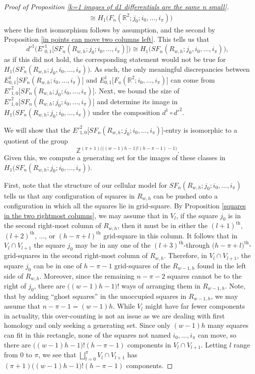 \documentclass[pagebackref,colorlinks,citecolor=blue,linkcolor=blue,urlcolor=blue,filecolor=blue]{article}
\theoremstyle{definition}\newtheorem{definition}[thm]{Definition}
\theoremstyle{definition}
\newcommand{\Z}{\ensuremath{\mathbb{Z}}}
\newcommand{\R}{\ensuremath{\mathbb{R}}}
\begin{document}
\begin{proof}[Proof of Proposition \ref{k=1 images of d1 differentials are the same n small}]
\begin{align*}
&\cong H_{1}\big(F_{n}(\R^{2}; j_{0}; i_{0}, \dots, i_{\pi})\big)
\end{align*}
where the first isomorphism follows by assumption, and the second by Proposition \ref{in points can move two columns left}.
This tells us that 
\[
d'^{1}\Big(E'^{1}_{0,1}\big[SF_{n}(R_{w, h}; j_{0}; i_{0}, \dots, i_{\pi})\big]\Big)\cong H_{1}\big(SF_{n}(R_{w, h}; j_{0}, i_{0}, \dots, i_{\pi})\big),
\]
as if this did not hold, the corresponding statement would not be true for $H_{1}\big(SF_{n}(R_{w, h}; j_{0}, i_{0}, \dots, i_{\pi})\big)$.
As such, the only meaningful discrepancies between $E^{1}_{0,1}\big[SF_{n}(R_{w, h}; i_{0}, \dots, i_{\pi})\big]$ and $E^{1}_{0,1}\big[F_{n}(\R^{2}; i_{0}, \dots, i_{\pi})\big]$ can come from $E'^{2}_{1, 0}\big[SF_{n}(R_{w, h}; j_{0}; i_{0}, \dots, i_{\pi})\big]$.
Next, we bound the size of $E'^{2}_{1, 0}\big[SF_{n}(R_{w, h}; j_{0}; i_{0}, \dots, i_{\pi})\big]$ and determine its image in $H_{1}\big(SF_{n}(R_{w, h}; j_{0}; i_{0}, \dots, i_{\pi})\big)$ under the composition $d^{1}\circ d'^{2}$.

We will show that the $E'^{2}_{1,0}\big[SF_{n}(R_{w, h}; j_{0}; i_{0}, \dots, i_{\pi})\big]$-entry is isomorphic to a quotient of the group
\[ \Z^{(\pi+1)\Big(\big((w-1)h-1\big)!(h-\pi-1)-1\Big)}.\]
Given this, we compute a generating set for the images of these classes in $H_{1}\big(SF_{n}(R_{w, h}; j_{0}; i_{0}, \dots, i_{\pi})\big)$.

First, note that the structure of our cellular model for $SF_{n}(R_{w, h}; j_{0}; i_{0}, \dots, i_{\pi})$ tells us that any configuration of squares in $R_{w,h}$ can be pushed onto a configuration in which all the squares lie in grid-square.
By Proposition \ref{squares in the two rightmost columns}, we may assume that in $V_{l}$, if the square $j_{0}$ is in the second right-most column of $R_{w, h}$, then it must be in either the $(l+1)^{\text{th}}$, $(l+2)^{\text{th}}$, $\dots$, or $(h-\pi+l)^{\text{th}}$ grid-square in this column.
It follows that in $V_{l}\cap V_{l+1}$ the square $j_{0}$ may be in any one of the $(l+3)^{\text{th}}$-through $\big(h-\pi+l)^{\text{th}}$-grid-squares in the second right-most column of $R_{w, h}$.
Therefore, in $V_{l}\cap V_{l+1}$, the square $j_{0}$ can be in one of $h-\pi-1$ grid-squares of the $R_{w-1, h}$ found in the left side of $R_{w, h}$.
Moreover, since the remaining $n-\pi-2$ squares cannot be to the right of $j_{0}$, there are $\big((w-1)h-1\big)!$ ways of arranging them in $R_{w-1, h}$.
Note, that by adding ``ghost squares'' in the unoccupied squares in $R_{w-1,h}$, we may assume that $n-\pi-1=(w-1)h$.
While $V_{l}$ might have far fewer components in actuality, this over-counting is not an issue as we are dealing with first homology and only seeking a generating set.
Since only $(w-1)h$ many squares can fit in this rectangle, none of the squares not named $i_{0}, \dots, i_{\pi}$ can move, so there are $\big((w-1)h-1\big)!(h-\pi -1)$ components in $V_{l}\cap V_{l+1}$.
Letting $l$ range from $0$ to $\pi$, we see that $\bigsqcup_{l=0}^{\pi}V_{l}\cap V_{l+1}$ has $(\pi+1)\big((w-1)h-1\big)!(h-\pi -1)$ components.


\end{proof}
\end{document}
